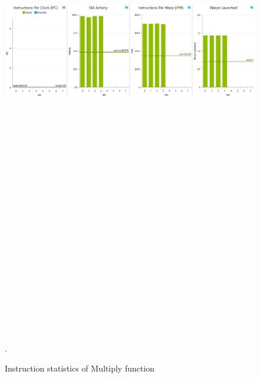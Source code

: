 \documentclass[oneside,openright,12pt,final,en]{mgr}
\begin{document}
\begin{figure}[H]
	\centering
	\includegraphics[width=\textwidth, height=26cm,keepaspectratio]{mull_instructions}.
	\caption{Instruction statistics of Multiply function}
	\label{fig:multiply_instructions}
\end{figure}
\end{document}
